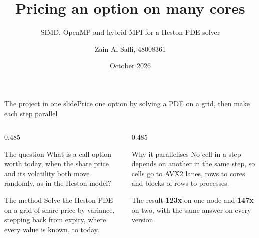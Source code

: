 \documentclass[aspectratio=169,11pt]{beamer}
\title[Parallel Heston PDE pricer]{Pricing an option on many cores}
\subtitle{SIMD, OpenMP and hybrid MPI for a Heston PDE solver}
\author[Zain Al-Saffi]{Zain Al-Saffi, 48008361}
\institute[]{COSC3500 Milestone 2}
\date{October 2026}
\newcommand{\xMpiOne}{123}
\newcommand{\xMpiTwo}{147}
\begin{document}

\begin{frame}[plain]
  \titlepage
\end{frame}

\begin{frame}{The project in one slide}{Price one option by solving a PDE on a grid, then make each step parallel}
  \begin{columns}[T,onlytextwidth]
    \begin{column}{0.485\textwidth}
      \begin{block}{The question}
        What is a call option worth today, when the share price and its
        volatility both move randomly, as in the Heston model?
      \end{block}
      \begin{block}{The method}
        Solve the Heston PDE on a grid of share price by variance, stepping
        back from expiry, where every value is known, to today.
      \end{block}
    \end{column}
    \begin{column}{0.485\textwidth}
      \begin{block}{Why it parallelises}
        No cell in a step depends on another in the same step, so cells go
        to AVX2 lanes, rows to cores and blocks of rows to processes.
      \end{block}
      \begin{block}{The result}
        {\color{sigblue}\large\bfseries \xMpiOne x} on one node and
        {\color{sigblue}\large\bfseries \xMpiTwo x} on two, with the same
        answer on every version.
      \end{block}
    \end{column}
  \end{columns}
\end{frame}
\end{document}

